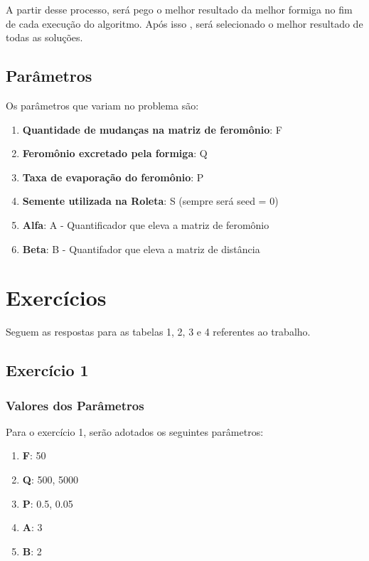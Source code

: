 \documentclass[hidelinks,12pt]{article}
\begin{document}
		A partir desse processo, será pego o melhor resultado da melhor formiga no fim de cada execução do algoritmo. Após isso , será selecionado o melhor resultado de todas as soluções.
		
	\subsection{Parâmetros}
		
		Os parâmetros que variam no problema são:
		\begin{enumerate}
			\item \textbf{Quantidade de mudanças na matriz de feromônio}: F
			\item \textbf{Feromônio excretado pela formiga}: Q
			\item \textbf{Taxa de evaporação do feromônio}: P
			\item \textbf{Semente utilizada na Roleta}: S (sempre será seed = 0)
			\item \textbf{Alfa}: A  - Quantificador que eleva a matriz de feromônio 
			\item \textbf{Beta}: B - Quantifador que eleva a matriz de distância 
		\end{enumerate} 
		
\section{Exercícios}

	Seguem as respostas para as tabelas 1, 2, 3 e 4 referentes ao trabalho.
	
	
\subsection{Exercício 1}
	
	\subsubsection{Valores dos Parâmetros}	
	Para o exercício 1, serão adotados os seguintes parâmetros:
	
	\begin{enumerate}
		\item \textbf{F}:  50
		\item \textbf{Q}:  500, 5000
		\item \textbf{P}:  0.5, 0.05
		\item \textbf{A}:  3
		\item \textbf{B}:  2
	
	\end{enumerate}
	
\end{document}

